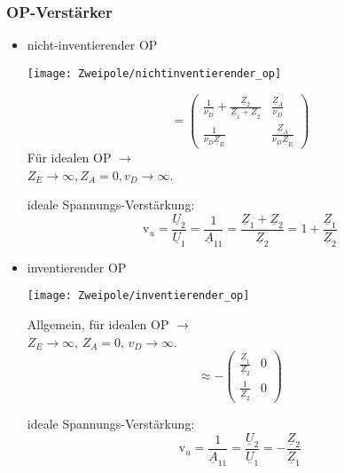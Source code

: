 \subsubsection{OP-Verstärker}
\begin{itemize}[leftmargin=*]
	\item nicht-inventierender OP\\
			\begin{minipage}{0.4\columnwidth}
				\texttt{[image: Zweipole/nichtinventierender\_op]}
			\end{minipage}
			\begin{minipage}{0.6\columnwidth}
				\renewcommand*{\arraystretch}{1.7}
				\begin{equation*}
					[\underline{A}] = \begin{pmatrix}
						\frac{1}{\nu_D} + \frac{\underline{Z}_2}{\underline{Z}_1 + \underline{Z}_2} & \frac{\underline{Z}_A}{\nu_D} \\
						\frac{1}{\nu_D \underline{Z}_E} & \frac{\underline{Z}_A}{\nu_D \underline{Z}_E}
					\end{pmatrix}
				\end{equation*}
			Für idealen OP $\rightarrow$ \\
			$Z_E\rightarrow\infty, Z_A=0, v_D\rightarrow\infty$.
			\vspace{1.1em}
			\end{minipage}
			ideale Spannungs-Verstärkung:
			\begin{equation*}
				\text{v}_u=\frac{\underline{U}_2}{\underline{U}_1}=
				\frac{1}{\underline{A}_{11}}=\frac{\underline{Z}_1+\underline{Z}_2}{\underline{Z}_2} = 1 + \frac{\underline{Z}_1}{\underline{Z}_2}
			\end{equation*}
	\item inventierender OP\\
	\begin{minipage}{0.4\columnwidth}
		\texttt{[image: Zweipole/inventierender\_op]}
	\end{minipage}
	\begin{minipage}{0.6\columnwidth}
		\renewcommand*{\arraystretch}{1.7}
		Allgemein, für idealen OP $\rightarrow$ \\
		$Z_E\rightarrow\infty,\, Z_A=0,\, v_D\rightarrow\infty$.
		\begin{equation*}
			[\underline{A}] \approx - \begin{pmatrix}
				\frac{\underline{Z}_1}{\underline{Z}_2} & 0 \\
				\frac{1}{\underline{Z}_2} & 0
			\end{pmatrix}
		\end{equation*}
			\vspace{1em}
	\end{minipage}
			ideale Spannungs-Verstärkung:
	\begin{equation*}
		\text{v}_u=\frac{1}{\underline{A}_{11}}=\frac{\underline{U}_2}{\underline{U}_1}=-\frac{\underline{Z}_2}{\underline{Z}_1}
	\end{equation*}
\end{itemize}

